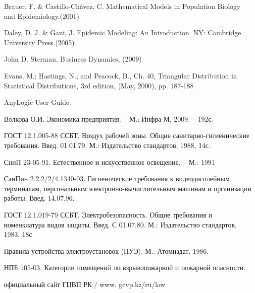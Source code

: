 \begin{thebibliography}{99}
Brauer, F. \& Castillo-Chávez, C. Mathematical Models in Population Biology and Epidemiology.(2001)

Daley, D. J. \& Gani, J. Epidemic Modeling: An Introduction. NY: Cambridge University Press.(2005)

John D. Sterman, Business Dynamics, (2009)

Evans, M.; Hastings, N.; and Peacock, B., Ch. 40, Triangular Distribution in Statistical Distributions, 3rd edition, (May, 2000), pp. 187-188

AnyLogic User Guide.

Волкова О.И. Экономика предприятия. – М.: Инфра-М, 2009. – 192с.

ГОСТ 12.1.005-88 ССБТ. Воздух рабочей зоны. Общие санитарно-гигиенические требования. Введ. 01.01.79. М.: Издательство стандартов, 1988, 14с.

СниП 23-05-91. Естественное и искусственное освещение. – М.: 1991

СанПин 2.2.2/2/4.1340-03. Гигиенические требования  к видеодисплейным терминалам, персональным электронно-вычислительным машинам и организации работы. Введ. 14.07.96.

ГОСТ 12.1.019-79 ССБТ. Электробезопасность. Общие требования и номенклатура видов защиты. Введ. С 01.07.80. М.: Издательство стандартов, 1983, 18с

Правила устройства электроустановок (ПУЭ). М.: Атомиздат, 1986.

НПБ 105-03. Категории помещений по взрывопожарной и пожарной опасности.

официальный сайт ГЦВП РК:/ www. gcvp.kz/ru/law

\end{thebibliography}



